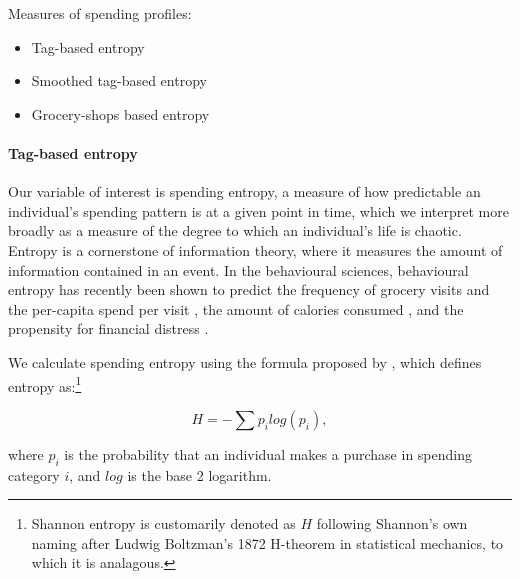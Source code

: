 Measures of spending profiles:
\begin{itemize}
    \item Tag-based entropy

    \item Smoothed tag-based entropy

    \item Grocery-shops based entropy
\end{itemize}


\paragraph{Tag-based entropy}%
\label{par:tag_based_entropy}

Our variable of interest is spending entropy, a measure of how predictable an
individual's spending pattern is at a given point in time, which we interpret
more broadly as a measure of the degree to which an individual's life is
chaotic. Entropy is a cornerstone of information theory, where it measures the
amount of information contained in an event. In the behavioural sciences,
behavioural entropy has recently been shown to predict the frequency of grocery
visits and the per-capita spend per visit \citep{guidotti2015behavioral}, the
amount of calories consumed \citep{skatova2019those}, and the propensity for
financial distress \citep{muggleton2020evidence}.

We calculate spending entropy using the formula proposed by
\citet{shannon1948mathematical}, which defines entropy as:\footnote{Shannon
    entropy is customarily denoted as $H$ following Shannon's own naming after
    Ludwig Boltzman's 1872 H-theorem in statistical mechanics, to which it is
analagous.}

\begin{equation}
\label{equ:entropy}
    H = -\sum{p_i}log(p_i),
\end{equation}

where $p_i$ is the probability that an individual makes a purchase in spending
category $i$, and $log$ is the base 2 logarithm.


